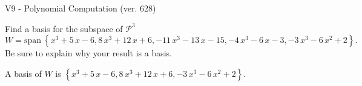 \begin{exercise}
  \begin{exerciseTitle}V9 - Polynomial Computation (ver. 628)\end{exerciseTitle}
  \begin{exerciseStatement}
    Find a basis for the subspace of \(\mathcal{P}^3\) 
\[W=\mathrm{span}\ \left\{x^{3} + 5 \, x - 6 , 8 \, x^{3} + 12 \, x + 6 , -11 \, x^{3} - 13 \, x - 15 , -4 \, x^{3} - 6 \, x - 3 , -3 \, x^{3} - 6 \, x^{2} + 2\right\}.\]
 Be sure to explain why your result is a basis.


  \end{exerciseStatement}
  \begin{exerciseAnswer}
   A basis of \(W\) is  \(\left\{x^{3} + 5 \, x - 6 , 8 \, x^{3} + 12 \, x + 6 , -3 \, x^{3} - 6 \, x^{2} + 2\right\}\).
  


  \end{exerciseAnswer}
\end{exercise}